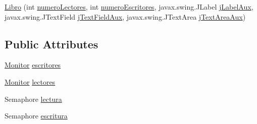 \begin{DoxyCompactItemize}
\item 
\mbox{\hyperlink{classpecl3ignacioriberasemaforos_1_1_libro_a9ed8398ba1fbcf45b74e0d73af9a0831}{Libro}} (int \mbox{\hyperlink{classpecl3ignacioriberasemaforos_1_1_libro_aab14f16eb696d97ce1373e7325b61077}{numero\+Lectores}}, int \mbox{\hyperlink{classpecl3ignacioriberasemaforos_1_1_libro_ad4d82015922415d96864d1370a3af2c5}{numero\+Escritores}}, javax.\+swing.\+J\+Label \mbox{\hyperlink{classpecl3ignacioriberasemaforos_1_1_libro_a126ba60cdc31f30cdf071606013951b7}{j\+Label\+Aux}}, javax.\+swing.\+J\+Text\+Field \mbox{\hyperlink{classpecl3ignacioriberasemaforos_1_1_libro_a4688b8afa2701493ac45bfbc35b1f8ca}{j\+Text\+Field\+Aux}}, javax.\+swing.\+J\+Text\+Area \mbox{\hyperlink{classpecl3ignacioriberasemaforos_1_1_libro_ab049d0206067da023a6231357b7efc75}{j\+Text\+Area\+Aux}})
\end{DoxyCompactItemize}
\subsection*{Public Attributes}
\begin{DoxyCompactItemize}
\item 
\mbox{\hyperlink{classpecl3ignacioriberasemaforos_1_1_monitor}{Monitor}} \mbox{\hyperlink{classpecl3ignacioriberasemaforos_1_1_libro_a54d314cadff093d0ca9a579fdbc049fe}{escritores}}
\item 
\mbox{\hyperlink{classpecl3ignacioriberasemaforos_1_1_monitor}{Monitor}} \mbox{\hyperlink{classpecl3ignacioriberasemaforos_1_1_libro_a47b5756a2a1a97ad2a3c1d15996e7b63}{lectores}}
\item 
Semaphore \mbox{\hyperlink{classpecl3ignacioriberasemaforos_1_1_libro_a5b95dab8238745eb32f335c03f2d2dab}{lectura}}
\item 
Semaphore \mbox{\hyperlink{classpecl3ignacioriberasemaforos_1_1_libro_aad0e4f77750ad50ae397c58273dd4527}{escritura}}
\end{DoxyCompactItemize}
